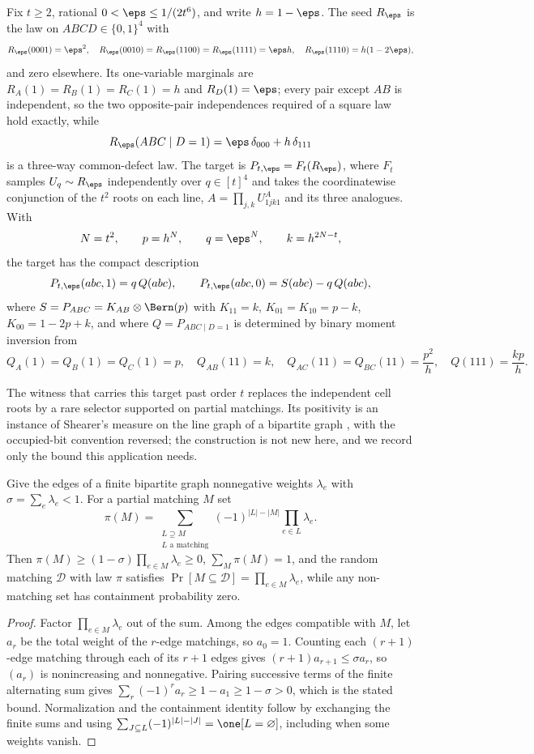 Fix $t\ge2$, rational $0<\eps\le1/(2t^6)$, and write $h=1-\eps$. The seed $R_\eps$ is the law on $ABCD\in\{0,1\}^4$ with
\[
R_\eps(0001)=\eps^2,\quad
R_\eps(0010)=R_\eps(1100)=R_\eps(1111)=\eps h,\quad
R_\eps(1110)=h(1-2\eps),
\]
and zero elsewhere. Its one-variable marginals are $R_A(1)=R_B(1)=R_C(1)=h$ and $R_D(1)=\eps$; every pair except $AB$ is independent, so the two opposite-pair independences required of a square law hold exactly, while
\[
R_\eps(ABC\mid D=1)=\eps\,\delta_{000}+h\,\delta_{111}
\]
is a three-way common-defect law. The target is $P_{t,\eps}=F_t(R_\eps)$, where $F_t$ samples $U_q\sim R_\eps$ independently over $q\in[t]^4$ and takes the coordinatewise conjunction of the $t^2$ roots on each line, $A=\prod_{j,k}U^A_{1jk1}$ and its three analogues. With
\[
N=t^2,\qquad p=h^N,\qquad q=\eps^N,\qquad k=h^{2N-t},
\]
the target has the compact description
\begin{equation}\label{eq:rareselector}
P_{t,\eps}(abc,1)=q\,Q(abc),\qquad
P_{t,\eps}(abc,0)=S(abc)-q\,Q(abc),
\end{equation}
where $S=P_{ABC}=K_{AB}\otimes\Bern(p)$ with $K_{11}=k$, $K_{01}=K_{10}=p-k$, $K_{00}=1-2p+k$, and where $Q=P_{ABC\mid D=1}$ is determined by binary moment inversion from
\[
Q_A(1)=Q_B(1)=Q_C(1)=p,\quad
Q_{AB}(11)=k,\quad
Q_{AC}(11)=Q_{BC}(11)=\frac{p^2}h,\quad
Q(111)=\frac{kp}h .
\]

The witness that carries this target past order $t$ replaces the independent cell roots by a rare selector supported on partial matchings. Its positivity is an instance of Shearer's measure on the line graph of a bipartite graph \cite{Shearer1985}, with the occupied-bit convention reversed; the construction is not new here, and we record only the bound this application needs.

\begin{lemma}\label{lem:shearer}
Give the edges of a finite bipartite graph nonnegative weights $\lambda_e$ with $\sigma=\sum_e\lambda_e<1$. For a partial matching $M$ set
\[
\pi(M)=\sum_{\substack{L\supseteq M\\ L\text{ a matching}}}(-1)^{|L|-|M|}\prod_{e\in L}\lambda_e .
\]
Then $\pi(M)\ge(1-\sigma)\prod_{e\in M}\lambda_e\ge0$, $\sum_M\pi(M)=1$, and the random matching $\mathcal D$ with law $\pi$ satisfies $\Pr[M\subseteq\mathcal D]=\prod_{e\in M}\lambda_e$, while any non-matching set has containment probability zero.
\end{lemma}

\begin{proof}
Factor $\prod_{e\in M}\lambda_e$ out of the sum. Among the edges compatible with $M$, let $a_r$ be the total weight of the $r$-edge matchings, so $a_0=1$. Counting each $(r+1)$-edge matching through each of its $r+1$ edges gives $(r+1)a_{r+1}\le\sigma a_r$, so $(a_r)$ is nonincreasing and nonnegative. Pairing successive terms of the finite alternating sum gives $\sum_r(-1)^ra_r\ge1-a_1\ge1-\sigma>0$, which is the stated bound. Normalization and the containment identity follow by exchanging the finite sums and using $\sum_{J\subseteq L}(-1)^{|L|-|J|}=\one[L=\varnothing]$, including when some weights vanish.
\end{proof}

